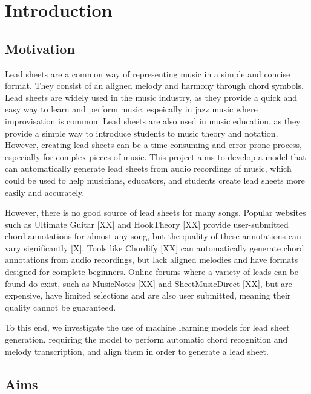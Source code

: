 \chapter{Introduction}

\section{Motivation}

Lead sheets are a common way of representing music in a simple and concise format. They consist of an aligned melody and harmony through chord symbols. Lead sheets are widely used in the music industry, as they provide a quick and easy way to learn and perform music, espeically in jazz music where improvisation is common. Lead sheets are also used in music education, as they provide a simple way to introduce students to music theory and notation. However, creating lead sheets can be a time-consuming and error-prone process, especially for complex pieces of music. This project aims to develop a model that can automatically generate lead sheets from audio recordings of music, which could be used to help musicians, educators, and students create lead sheets more easily and accurately. 

However, there is no good source of lead sheets for many songs. Popular websites such as Ultimate Guitar [XX] and HookTheory [XX] provide user-submitted chord annotations for almost any song, but the quality of these annotations can vary significantly [X]. Tools like Chordify [XX] can automatically generate chord annotations from audio recordings, but lack aligned melodies and have formats designed for complete beginners. Online forums where a variety of leads can be found do exist, such as MusicNotes [XX] and SheetMusicDirect [XX], but are expensive, have limited selections and are also user submitted, meaning their quality cannot be guaranteed.

To this end, we investigate the use of machine learning models for lead sheet generation, requiring the model to perform automatic chord recognition and melody transcription, and align them in order to generate a lead sheet.

\section{Aims}

